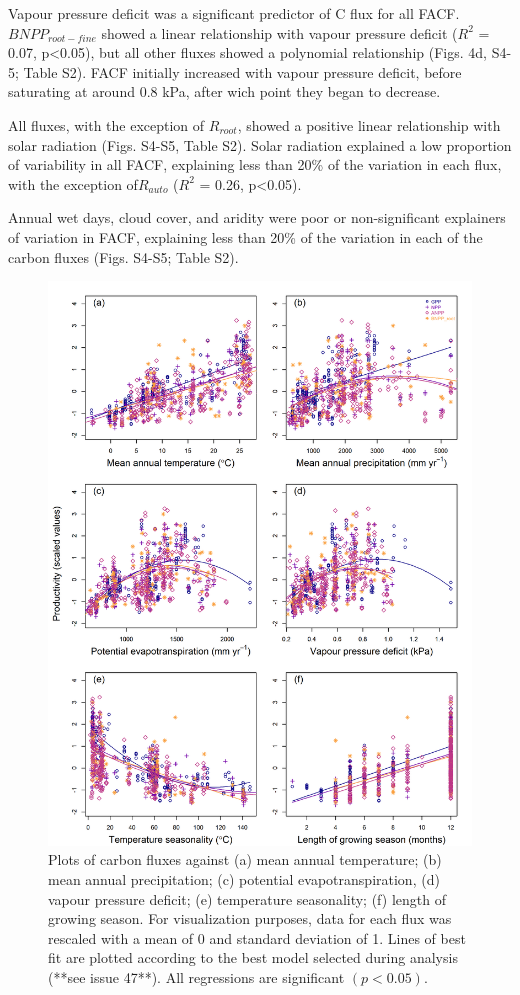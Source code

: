 \documentclass[]{article}
\begin{document}
Vapour pressure deficit was a significant predictor of C flux for all
FACF. \(BNPP_{root-fine}\) showed a linear relationship with vapour
pressure deficit (\(R^2\) = 0.07, p\textless{}0.05), but all other
fluxes showed a polynomial relationship (Figs. 4d, S4-5; Table S2). FACF
initially increased with vapour pressure deficit, before saturating at
around 0.8 kPa, after wich point they began to decrease.

All fluxes, with the exception of \(R_{root}\), showed a positive linear
relationship with solar radiation (Figs. S4-S5, Table S2). Solar
radiation explained a low proportion of variability in all FACF,
explaining less than 20\% of the variation in each flux, with the
exception of\(R_{auto}\) (\(R^2\) = 0.26, p\textless{}0.05).

Annual wet days, cloud cover, and aridity were poor or non-significant
explainers of variation in FACF, explaining less than 20\% of the
variation in each of the carbon fluxes (Figs. S4-S5; Table S2).

\begin{figure}[H]
\includegraphics[width=1\linewidth]{combined_plots} \caption{Plots of carbon fluxes against (a) mean annual temperature; (b) mean annual precipitation; (c) potential evapotranspiration, (d) vapour pressure deficit; (e) temperature seasonality; (f) length of growing season. For visualization purposes, data for each flux was rescaled with a mean of 0 and standard deviation of 1. Lines of best fit are plotted according to the best model selected during analysis (**see issue 47**). All regressions are significant $(p<0.05)$.}\label{fig:unnamed-chunk-9}
\end{figure}
\end{document}
